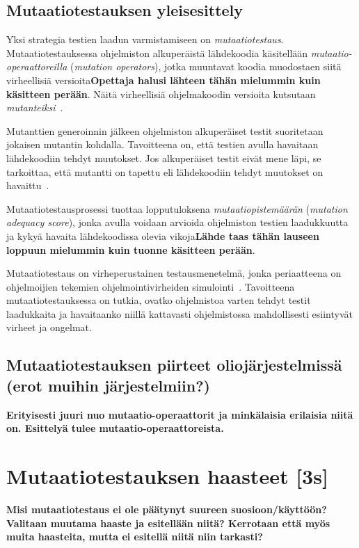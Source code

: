 \documentclass[finnish, grading]{tktltiki2}
\theoremstyle{definition}
\theoremstyle{remark}
\begin{document}
\subsection{Mutaatiotestauksen yleisesittely}

Yksi strategia testien laadun varmistamiseen on \textit{mutaatiotestaus}. Mutaatiotestauksessa ohjelmiston alkuperäistä lähdekoodia käsitellään \textit{mutaatio-operaattoreilla} (\textit{mutation operators}), jotka muuntavat koodia muodostaen siitä virheellisiä versioita\textbf{Opettaja halusi lähteen tähän mielummin kuin käsitteen perään}. Näitä virheellisiä ohjelmakoodin versioita kutsutaan \textit{mutanteiksi}~\cite[s. 869]{Ma:Harrold:Kwon:2006}. 

Mutanttien generoinnin jälkeen ohjelmiston alkuperäiset testit suoritetaan jokaisen mutantin kohdalla. Tavoitteena on, että testien avulla havaitaan lähdekoodiin tehdyt muutokset. Jos alkuperäiset testit eivät mene läpi, se tarkoittaa, että mutantti on tapettu eli lähdekoodiin tehdyt muutokset on havaittu~\cite[s. 9]{Kim:Clark:McDermid:2000}. 

Mutaatiotestausprosessi tuottaa lopputuloksena \textit{mutaatiopistemäärän} (\textit{mutation adequacy score}), jonka avulla voidaan arvioida ohjelmiston testien laadukkuutta ja kykyä havaita lähdekoodissa olevia vikoja\textbf{Lähde taas tähän lauseen loppuun mielummin kuin tuonne käsitteen perään}. 

Mutaatiotestaus on virheperustainen testausmenetelmä, jonka periaatteena on ohjelmoijien tekemien ohjelmointivirheiden simulointi~\cite[s. 649]{Jia:Harman:2011}. Tavoitteena mutaatiotestauksessa on tutkia, ovatko ohjelmistoa varten tehdyt testit laadukkaita ja havaitaanko niillä kattavasti ohjelmistossa mahdollisesti esiintyvät virheet ja ongelmat. 


\subsection{Mutaatiotestauksen piirteet oliojärjestelmissä (erot muihin järjestelmiin?)}

\textbf{Erityisesti juuri nuo mutaatio-operaattorit ja minkälaisia erilaisia niitä on. Esittelyä tulee mutaatio-operaattoreista.}


\section{Mutaatiotestauksen haasteet [3s]}

\textbf{Misi mutaatiotestaus ei ole päätynyt suureen suosioon/käyttöön? Valitaan muutama haaste ja esitellään niitä? Kerrotaan että myös muita haasteita, mutta ei esitellä niitä niin tarkasti?}
\end{document}
